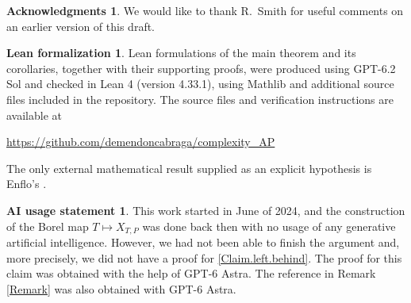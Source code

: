 \documentclass[letterpaper]{amsart}
\numberwithin{equation}{section}
\theoremstyle{definition}
\newtheorem*{acknowledgments}{Acknowledgments}
\newtheorem*{leanformalization}{Lean formalization}
\newtheorem*{AIusage}{AI usage statement}
\begin{document}
\begin{acknowledgments}
    We would like to thank R.\ Smith for useful comments on an earlier version of this draft. 
\end{acknowledgments} 


\begin{leanformalization}
Lean formulations of the main theorem and its corollaries,
together with their supporting proofs, were produced using
GPT-6.2 Sol and checked in Lean 4 (version 4.33.1), using
Mathlib and additional source files included in the repository.
The source files and verification instructions are available at
\begin{center}
\url{https://github.com/demendoncabraga/complexity_AP}
\end{center}
\noindent
The only external mathematical result supplied as an explicit
hypothesis is Enflo's \cite[Theorem 1]{Enflo1973Acta}.
\end{leanformalization}

 \begin{AIusage}
This work started in June of 2024, and the construction of the Borel map   $T\mapsto X_{T,P}$ was done back then with no usage of any generative artificial intelligence. However, we had not been able to finish the argument and, more precisely, we did not have a proof for  \eqref{Claim.left.behind}. The proof for this claim was obtained with the help of GPT-6 Astra. The reference \cite{FigielJohnsonPelczynski2011Israel} in Remark \ref{Remark} was also obtained with GPT-6 Astra.
\end{AIusage}

\end{document}
